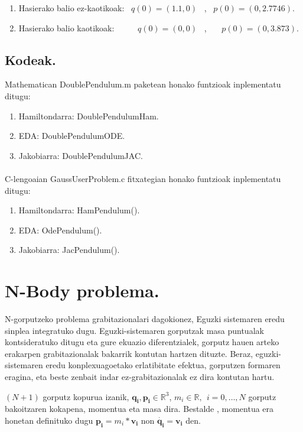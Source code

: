 \begin{enumerate}
   \item Hasierako balio ez-kaotikoak:   
   \ $q(0)=(1.1, 0)$ \ , \ $p(0)=(0,2.7746)$.    
   \item Hasierako balio kaotikoak: \ \ \ \ \    
   $q(0)=(0,0)$ \ , \ \ \  $p(0)=(0,3.873)$.
\end{enumerate}


\subsection{Kodeak.}

Mathematican DoublePendulum.m paketean honako funtzioak inplementatu ditugu:

\begin{enumerate}
   \item Hamiltondarra: DoublePendulumHam.
   \item EDA: DoublePendulumODE.
   \item Jakobiarra: DoublePendulumJAC.
\end{enumerate}

\paragraph*{}C-lengoaian GaussUserProblem.c fitxategian honako funtzioak inplementatu ditugu:

\begin{enumerate}
   \item Hamiltondarra: HamPendulum().
   \item EDA: OdePendulum().
   \item Jakobiarra: JacPendulum().
\end{enumerate}

\section{N-Body problema.}

N-gorputzeko problema grabitazionalari dagokionez, Eguzki sistemaren eredu sinplea integratuko dugu. Eguzki-sistemaren gorputzak masa puntualak kontsideratuko ditugu eta gure ekuazio diferentzialek, gorputz hauen arteko erakarpen grabitazionalak bakarrik kontutan hartzen dituzte. Beraz, eguzki-sistemaren eredu konplexuagoetako erlatibitate efektua, gorputzen formaren eragina, eta beste zenbait indar ez-grabitazionalak ez dira kontutan hartu.

$(N+1)$ gorputz kopurua izanik, $\mathbf{q_i},\mathbf{p_i}\in \mathbb{R}^3$, $m_i \in \mathbb{R}, \ \ i=0,\dots,N$ gorputz bakoitzaren kokapena, momentua eta masa dira. Bestalde , momentua era honetan definituko dugu $\mathbf{p_i}=m_i*\mathbf{v_i}$ non $\dot{\mathbf{q_i}}=\mathbf{v_i}$ den.

